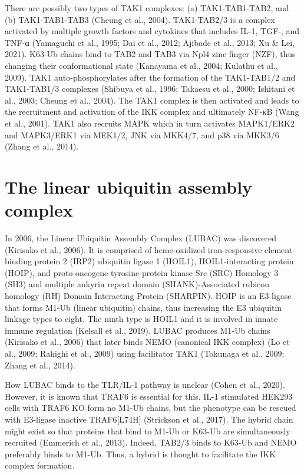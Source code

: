 There are possibly two types of TAK1 complexes: (a) TAK1-TAB1-TAB2, and (b) TAK1-TAB1-TAB3 (Cheung et al., 2004). TAK1-TAB2/3 is a complex activated by multiple growth factors and cytokines that includes IL-1, TGF-{\textbeta}, and TNF-α (Yamaguchi et al., 1995; Dai et al., 2012; Ajibade et al., 2013; Xu \& Lei, 2021). K63-Ub chains bind to TAB2 and TAB3 via Npl4 zinc finger (NZF), thus changing their conformational state (Kanayama et al., 2004; Kulathu et al., 2009). TAK1 auto-phosphorylates after the formation of the TAK1-TAB1/2 and TAK1-TAB1/3 complexes (Shibuya et al., 1996; Takaesu et al., 2000; Ishitani et al., 2003; Cheung et al., 2004). The TAK1 complex is then activated and leads to the recruitment and activation of the IKK complex and ultimately NF-κB (Wang et al., 2001). TAK1 also recruits MAPK which in turn activates MAPK1/ERK2 and MAPK3/ERK1 via MEK1/2, JNK via MKK4/7, and p38 via MKK3/6 (Zhang et al., 2014).

\section{The linear ubiquitin assembly complex}
\label{section:LUBAC}
In 2006, the Linear Ubiquitin Assembly Complex (LUBAC) was discovered (Kirisako et al., 2006). It is comprised of heme-oxidized iron-responsive element-binding protein 2 (IRP2) ubiquitin ligase 1 (HOIL1), HOIL1-interacting protein (HOIP), and proto-oncogene tyrosine-protein kinase Src (SRC) Homology 3 (SH3) and multiple ankyrin repeat domain (SHANK)-Associated rubicon homology (RH) Domain Interacting Protein (SHARPIN). HOIP is an E3 ligase that forms M1-Ub (linear ubiquitin) chains, thus increasing the E3 ubiquitin linkage types to eight. The ninth type is HOIL1 and it is involved in innate immune regulation (Kelsall et al., 2019). LUBAC produces M1-Ub chains (Kirisako et al., 2006) that later binds NEMO (canonical IKK complex) (Lo et al., 2009; Rahighi et al., 2009) using facilitator TAK1 (Tokunaga et al., 2009; Zhang et al., 2014).

How LUBAC binds to the TLR/IL-1 pathway is unclear (Cohen et al., 2020). However, it is known that TRAF6 is essential for this. IL-1 stimulated HEK293 cells with TRAF6 KO form no M1-Ub chains, but the phenotype can be rescued with E3-ligase inactive TRAF6[L74H] (Strickson et al., 2017). The hybrid chain might exist so that proteins that bind to M1-Ub or K63-Ub are simultaneously recruited (Emmerich et al., 2013). Indeed, TAB2/3 binds to K63-Ub and NEMO preferably binds to M1-Ub. Thus, a hybrid is thought to facilitate the IKK complex formation.

